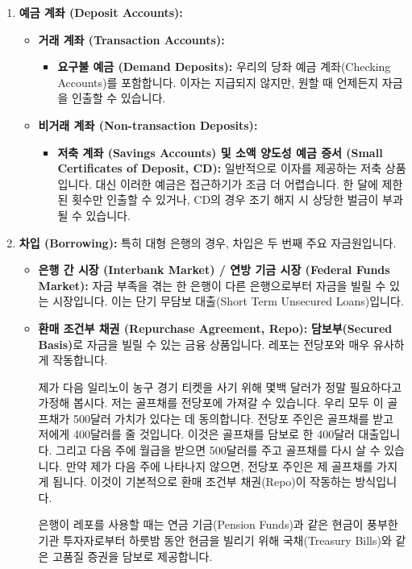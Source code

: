 \documentclass[11pt,a4paper]{book}
\theoremstyle{definition}
\begin{document}
\begin{summarybox}[title={은행의 주요 자금 조달원}]
\begin{enumerate}
    \item \textbf{예금 계좌 (Deposit Accounts):}
    \begin{itemize}
        \item \textbf{거래 계좌 (Transaction Accounts):}
        \begin{itemize}
            \item \textbf{요구불 예금 (Demand Deposits):} 우리의 당좌 예금 계좌(Checking Accounts)를 포함합니다. 이자는 지급되지 않지만, 원할 때 언제든지 자금을 인출할 수 있습니다.
        \end{itemize}
        \item \textbf{비거래 계좌 (Non-transaction Deposits):}
        \begin{itemize}
            \item \textbf{저축 계좌 (Savings Accounts) 및 소액 양도성 예금 증서 (Small Certificates of Deposit, CD):} 일반적으로 이자를 제공하는 저축 상품입니다. 대신 이러한 예금은 접근하기가 조금 더 어렵습니다. 한 달에 제한된 횟수만 인출할 수 있거나, CD의 경우 조기 해지 시 상당한 벌금이 부과될 수 있습니다.
        \end{itemize}
    \end{itemize}

    \item \textbf{차입 (Borrowing):}
    특히 대형 은행의 경우, 차입은 두 번째 주요 자금원입니다.
    \begin{itemize}
        \item \textbf{은행 간 시장 (Interbank Market) / 연방 기금 시장 (Federal Funds Market):} 자금 부족을 겪는 한 은행이 다른 은행으로부터 자금을 빌릴 수 있는 시장입니다. 이는 단기 무담보 대출(Short Term Unsecured Loans)입니다.
        \item \textbf{환매 조건부 채권 (Repurchase Agreement, Repo):} \textbf{담보부(Secured Basis)}로 자금을 빌릴 수 있는 금융 상품입니다. 레포는 전당포와 매우 유사하게 작동합니다.
        \begin{examplebox}[title={레포(Repo)의 전당포 비유}]
        제가 다음 일리노이 농구 경기 티켓을 사기 위해 몇백 달러가 정말 필요하다고 가정해 봅시다. 저는 골프채를 전당포에 가져갈 수 있습니다. 우리 모두 이 골프채가 500달러 가치가 있다는 데 동의합니다. 전당포 주인은 골프채를 받고 저에게 400달러를 줄 것입니다. 이것은 골프채를 담보로 한 400달러 대출입니다. 그리고 다음 주에 월급을 받으면 500달러를 주고 골프채를 다시 살 수 있습니다. 만약 제가 다음 주에 나타나지 않으면, 전당포 주인은 제 골프채를 가지게 됩니다. 이것이 기본적으로 환매 조건부 채권(Repo)이 작동하는 방식입니다.
        \end{examplebox}
        은행이 레포를 사용할 때는 연금 기금(Pension Funds)과 같은 현금이 풍부한 기관 투자자로부터 하룻밤 동안 현금을 빌리기 위해 국채(Treasury Bills)와 같은 고품질 증권을 담보로 제공합니다.


\end{itemize}
\end{enumerate}
\end{summarybox}
\end{document}
